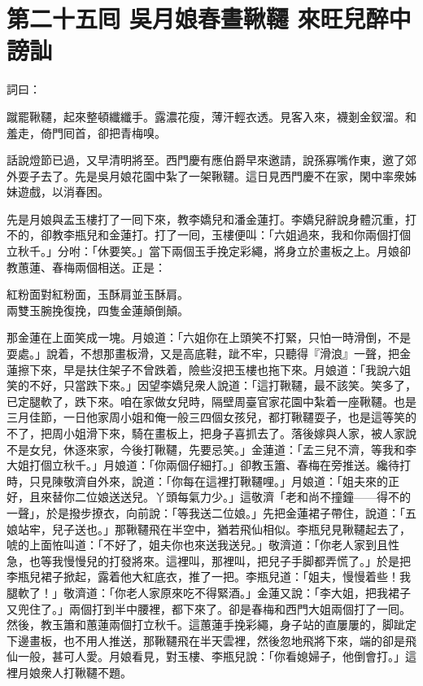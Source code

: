 
\chapter*{第二十五囘 吳月娘春晝鞦韆 來旺兒醉中謗訕}


詞曰：

\begin{myquote} 
蹴罷鞦韆，起來整頓纖纖手。露濃花瘦，薄汗輕衣透。見客入來，襪剗金釵溜。和羞走，倚門囘首，卻把青梅嗅。

\end{myquote} 

話說燈節已過，又早清明將至。西門慶有應伯爵早來邀請，說孫寡嘴作東，邀了郊外耍子去了。先是吳月娘花園中紮了一架鞦韆。這日見西門慶不在家，閑中率衆姊妹遊戲，以消春困。

先是月娘與孟玉樓打了一囘下來，教李嬌兒和潘金蓮打。李嬌兒辭說身體沉重，打不的，卻教李瓶兒和金蓮打。打了一囘，玉樓便叫：「六姐過來，我和你兩個打個立秋千。」分咐：「休要笑。」當下兩個玉手挽定彩繩，將身立於畫板之上。月娘卻教蕙蓮、春梅兩個相送。正是：

\begin{myquote}
紅粉面對紅粉面，玉酥肩並玉酥肩。\\兩雙玉腕挽復挽，四隻金蓮顛倒顛。
\end{myquote}

那金蓮在上面笑成一塊。{}月娘道：「六姐你在上頭笑不打緊，只怕一時滑倒，不是耍處。」說着，不想那畫板滑，又是高底鞋，跐不牢，只聽得『滑浪』一聲，把金蓮擦下來，{}早是扶住架子不曾跌着，險些沒把玉樓也拖下來。月娘道：「我說六姐笑的不好，只當跌下來。」{}因望李嬌兒衆人說道：「這打鞦韆，最不該笑。笑多了，已定腿軟了，跌下來。咱在家做女兒時，隔壁周臺官家花園中紮着一座鞦韆。也是三月佳節，一日他家周小姐和俺一般三四個女孩兒，都打鞦韆耍子，也是這等笑的不了，把周小姐滑下來，騎在畫板上，把身子喜抓去了。落後嫁與人家，被人家說不是女兒，休逐來家，今後打鞦韆，先要忌笑。」金蓮道：「孟三兒不濟，{}等我和李大姐打個立秋千。」月娘道：「你兩個仔細打。」卻教玉簫、春梅在旁推送。纔待打時，只見陳敬濟自外來，說道：「你每在這裡打鞦韆哩。」月娘道：「姐夫來的正好，且來替你二位娘送送兒。丫頭每氣力少。」這敬濟「老和尚不撞鐘——得不的一聲」，於是撥步撩衣，向前說：「等我送二位娘。」先把金蓮裙子帶住，說道：「五娘站牢，兒子送也。」那鞦韆飛在半空中，猶若飛仙相似。李瓶兒見鞦韆起去了，唬的上面恠叫道：「不好了，姐夫你也來送我送兒。」敬濟道：「你老人家到且性急，也等我慢慢兒的打發將來。這裡叫，那裡叫，把兒子手脚都弄慌了。」於是把李瓶兒裙子掀起，露着他大紅底衣，推了一把。李瓶兒道：「姐夫，慢慢着些！我腿軟了！」敬濟道：「你老人家原來吃不得緊酒。」金蓮又說：「李大姐，把我裙子又兜住了。」兩個打到半中腰裡，都下來了。卻是春梅和西門大姐兩個打了一囘。然後，教玉簫和蕙蓮兩個打立秋千。這蕙蓮手挽彩繩，身子站的直屢屢的，脚跐定下邊畫板，也不用人推送，那鞦韆飛在半天雲裡，然後忽地飛將下來，端的卻是飛仙一般，甚可人愛。{}月娘看見，對玉樓、李瓶兒說：「你看媳婦子，他倒會打。」這裡月娘衆人打鞦韆不題。

